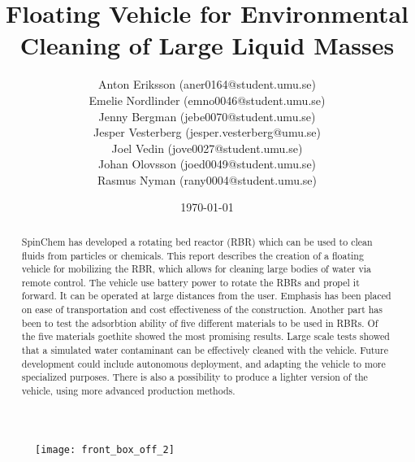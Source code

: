 \documentclass[11pt]{article}
\title{Floating Vehicle for Environmental \\ Cleaning of Large Liquid Masses}
\author{Anton Eriksson (aner0164@student.umu.se) \\
  Emelie Nordlinder (emno0046@student.umu.se) \\
  Jenny Bergman (jebe0070@student.umu.se) \\
  Jesper Vesterberg (jesper.vesterberg@umu.se) \\
  Joel Vedin (jove0027@student.umu.se) \\
  Johan Olovsson (joed0049@student.umu.se) \\
Rasmus Nyman (rany0004@student.umu.se)}
\date{\today}
\begin{document}
\begin{titlepage}
  \maketitle
  \thispagestyle{fancy}
  \rhead{\today}

\begin{figure}[H]
   \centering
   \texttt{[image: front\_box\_off\_2]}
\end{figure}

  \begin{abstract}
    \noindent
    SpinChem\textsuperscript{\textregistered} has developed a rotating bed reactor (RBR) which can be used to
    clean fluids from particles or chemicals. This report describes the creation of a floating
    vehicle for mobilizing the RBR, which allows for cleaning large bodies of
    water via remote control. The vehicle use battery power to rotate the RBRs and propel it forward. It can be operated at large distances from the
    user. Emphasis has been placed on ease of transportation and cost
    effectiveness of the construction. Another part has been to test the adsorbtion ability of five different materials to be used in RBRs. Of the five materials goethite showed the most promising results. Large scale tests showed that a simulated water
    contaminant can be effectively cleaned with the vehicle. Future development
    could include autonomous deployment, and adapting the vehicle to more specialized purposes. There is also a possibility
    to produce a lighter version of the vehicle, using more advanced
    production methods.
  \end{abstract}

\end{titlepage}

\lhead{\thetitle}
\rhead{\today}
\cfoot{\thepage}


\clearpage
\tableofcontents
\clearpage
\end{document}
